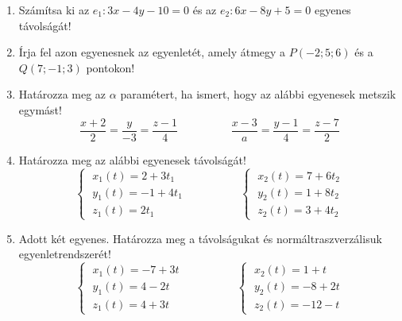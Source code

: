 \documentclass[a4paper, 12pt]{scrartcl}
\begin{document}
\begin{enumerate}
  \item Számítsa ki az $e_1: 3x - 4y - 10 = 0$ és az $e_2: 6x - 8y + 5 = 0$
        egyenes távolságát!

  \item Írja fel azon egyenesnek az egyenletét, amely átmegy a $P(-2;5;6)$ és a
        $Q(7; -1; 3)$ pontokon!

  \item Határozza meg az $\alpha$ paramétert, ha ismert, hogy az alábbi
        egyenesek metszik egymást!
        \[
          \frac{x + 2}{2} = \frac{y    }{-3} = \frac{z - 1}{4}
          \hspace{2cm}
          \frac{x - 3}{a} = \frac{y - 1}{4 } = \frac{z - 7}{2}
        \]

  \item Határozza meg az alábbi egyenesek távolságát!
        \[
          \begin{cases}
            \; x_1(t) =  2 + 3 t_1 \\
            \; y_1(t) = -1 + 4 t_1 \\
            \; z_1(t) =      2 t_1
          \end{cases}
          \hspace{2cm}
          \begin{cases}
            \; x_2(t) = 7 + 6 t_2 \\
            \; y_2(t) = 1 + 8 t_2 \\
            \; z_2(t) = 3 + 4 t_2
          \end{cases}
        \]

  \item Adott két egyenes. Határozza meg a távolságukat és normáltraszverzálisuk
        egyenletrendszerét!
        \[
          \begin{cases}
            \; x_1(t) = -7 + 3 t \\
            \; y_1(t) =  4 - 2 t \\
            \; z_1(t) =  4 + 3 t
          \end{cases}
          \hspace{2cm}
          \begin{cases}
            \; x_2(t) =   1 +   t \\
            \; y_2(t) =  -8 + 2 t \\
            \; z_2(t) = -12 -   t
          \end{cases}
        \]


\end{enumerate}
\end{document}

